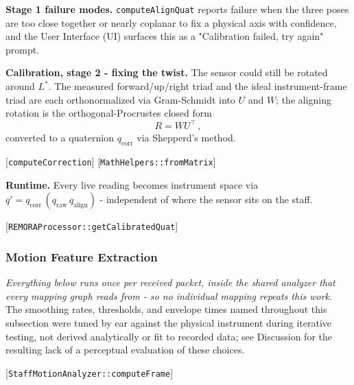 \documentclass[sigconf,nonacm]{acmart}
\newcommand{\coderef}[1]{{\small [#1]}}
\begin{document}
\textbf{Stage 1 failure modes.} \texttt{computeAlignQuat} reports failure when the three poses are
too close together or nearly coplanar to fix a physical axis with confidence, and the User Interface
(UI) surfaces this
as a "Calibration failed, try again" prompt.

\textbf{Calibration, stage 2 - fixing the twist.} The sensor could still be rotated around
$L^\ast$. The measured forward/up/right triad and the ideal instrument-frame triad are each
orthonormalized via Gram-Schmidt into $U$ and $W$; the aligning rotation is the orthogonal-Procrustes
closed form
\[
R = W U^{\top}\,,
\]
converted to a quaternion $q_{\text{corr}}$ via Shepperd's method.
\begin{flushright}
\coderef{\texttt{computeCorrection}}
\coderef{\texttt{MathHelpers::fromMatrix}}
\end{flushright}

\textbf{Runtime.} Every live reading becomes instrument space via
$q' = q_{\text{corr}}\,(q_{\text{raw}}\,q_{\text{align}})$ - independent of where the sensor sits on
the staff.
\begin{flushright}
\coderef{\texttt{REMORAProcessor::getCalibratedQuat}}
\end{flushright}

\subsubsection*{Motion Feature Extraction}

\textit{Everything below runs once per received packet, inside the shared analyzer that every
mapping graph reads from - so no individual mapping repeats this work.} The smoothing rates,
thresholds, and envelope times named throughout this subsection were tuned by ear against the
physical instrument during iterative testing, not derived analytically or fit to recorded data; see
Discussion for the resulting lack of a perceptual evaluation of these choices.
\begin{flushright}
\coderef{\texttt{StaffMotionAnalyzer::computeFrame}}
\end{flushright}
\end{document}
